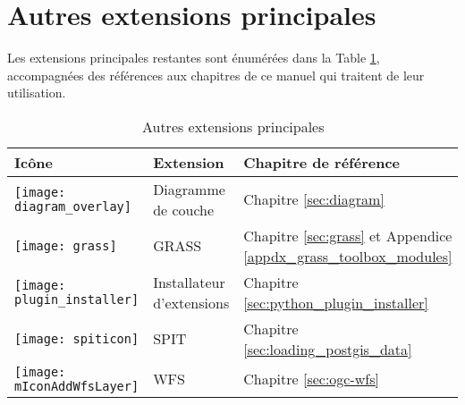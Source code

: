 \section{Autres extensions principales}


Les extensions principales restantes sont énumérées dans la Table \ref{tab:other_core},
accompagnées des références aux chapitres de ce manuel qui traitent de leur
utilisation.

\begin{table}[H]
\centering
 \begin{tabular}{|l|l|p{8cm}|}
\hline \textbf{Icône} & \textbf{Extension} & \textbf{Chapitre de référence}\\
\hline
\texttt{[image: diagram\_overlay]}
 & Diagramme de couche \index{extensions!diagramme} & Chapitre \ref{sec:diagram}\\
\hline
\texttt{[image: grass]}
 & GRASS \index{extensions!\grass!boîte à outils} & Chapitre \ref{sec:grass} et Appendice \ref{appdx_grass_toolbox_modules}\\
 \hline
\texttt{[image: plugin\_installer]}
 & Installateur d'extensions \index{extensions!installation} & Chapitre \ref{sec:python_plugin_installer}\\
\hline
\texttt{[image: spiticon]}
 & SPIT \index{extensions!spit} & Chapitre \ref{sec:loading_postgis_data} \\
 \hline
\texttt{[image: mIconAddWfsLayer]}
 & WFS & Chapitre \ref{sec:ogc-wfs} \\
\hline
\end{tabular}
\caption{Autres extensions principales}\label{tab:other_core}
\end{table}
